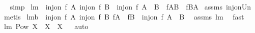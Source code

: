 \begin{isabellebody}
\isadelimproof
\ %
\endisadelimproof
%
\isatagproof
{}\isamarkupfalse%
\ simp%
\endisatagproof
{\isafoldproof}%
%
\isadelimproof
%
\endisadelimproof
\isanewline
\isanewline
{}\isamarkupfalse%
\ lm{}{}{}{\isacharcolon}\ \ {\isachardoublequoteopen}inj{\isacharunderscore}on\ f\ A{\isachardoublequoteclose}\ {\isachardoublequoteopen}inj{\isacharunderscore}on\ f\ B{\isachardoublequoteclose}\ \ {\isachardoublequoteopen}inj{\isacharunderscore}on\ f\ {\isacharparenleft}A\ {\isasymunion}\ B{\isacharparenright}\ {\isacharequal}\ {\isacharparenleft}f{\isacharbackquote}{\isacharparenleft}A{\isacharminus}B{\isacharparenright}\ {\isasyminter}\ {\isacharparenleft}f{\isacharbackquote}{\isacharparenleft}B{\isacharminus}A{\isacharparenright}{\isacharparenright}{\isacharequal}{\isacharbraceleft}{\isacharbraceright}{\isacharparenright}{\isachardoublequoteclose}\isanewline
%
\isadelimproof
%
\endisadelimproof
%
\isatagproof
{}\isamarkupfalse%
\ assms\ inj{\isacharunderscore}on{\isacharunderscore}Un\ \isamarkupfalse%
\ {\isacharparenleft}metis{\isacharparenright}%
\endisatagproof
{\isafoldproof}%
%
\isadelimproof
\isanewline
%
\endisadelimproof
\isanewline
{}\isamarkupfalse%
\ lm{}{}{}b{\isacharcolon}\ \ {\isachardoublequoteopen}inj{\isacharunderscore}on\ f\ A{\isachardoublequoteclose}\ {\isachardoublequoteopen}inj{\isacharunderscore}on\ f\ B{\isachardoublequoteclose}\ {\isachardoublequoteopen}f{\isacharbackquote}A\ {\isasyminter}\ {\isacharparenleft}f{\isacharbackquote}B{\isacharparenright}{\isacharequal}{\isacharbraceleft}{\isacharbraceright}{\isachardoublequoteclose}\ \ {\isachardoublequoteopen}inj{\isacharunderscore}on\ f\ {\isacharparenleft}A\ {\isasymunion}\ B{\isacharparenright}{\isachardoublequoteclose}\ \isanewline
%
\isadelimproof
%
\endisadelimproof
%
\isatagproof
{}\isamarkupfalse%
\ assms\ lm{}{}{}\ \isamarkupfalse%
\ fast%
\endisatagproof
{\isafoldproof}%
%
\isadelimproof
\isanewline
%
\endisadelimproof
\isanewline
{}\isamarkupfalse%
\ lm{}{}{}{\isacharcolon}\ {\isachardoublequoteopen}{\isacharparenleft}Pow\ X\ {\isacharequal}\ {\isacharbraceleft}X{\isacharbraceright}{\isacharparenright}\ {\isacharequal}\ {\isacharparenleft}X{\isacharequal}{\isacharbraceleft}{\isacharbraceright}{\isacharparenright}{\isachardoublequoteclose}%
\isadelimproof
\ %
\endisadelimproof
%
\isatagproof
{}\isamarkupfalse%
\ auto%
\endisatagproof
{\isafoldproof}%
%
\isadelimproof
%
\endisadelimproof
\isanewline
%
\isadelimtheory
\isanewline
%
\endisadelimtheory
%
\isatagtheory
{}\isamarkupfalse%
%
\endisatagtheory
{\isafoldtheory}%
%
\isadelimtheory
%
\endisadelimtheory
\end{isabellebody}%
